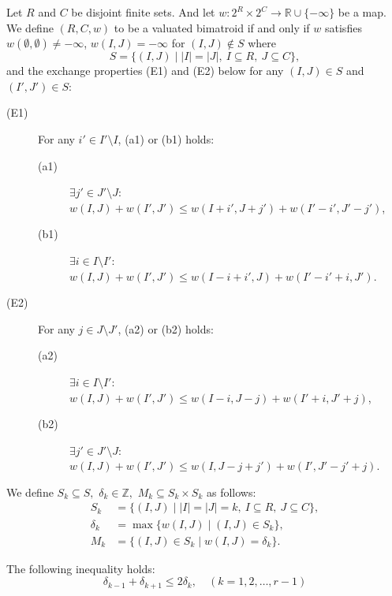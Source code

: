 \begin{definition}
Let $ R $ and $ C $ be disjoint finite sets. 
And let $ w : 2^R \times 2^C \to \mathbb{R} \cup \{ - \infty \} $ be a map. 
We define $ ( R, C, w ) $ to be a valuated bimatroid 
if and only if $ w $ satisfies $ w( \emptyset , \emptyset) \neq - \infty $, 
$ w (I,J) = - \infty $ for $( I,J) \notin S $ where
\[ S = \{ (I,J) \mid |I| = |J|, \  I \subseteq R , \ J \subseteq C \}, \]
and the exchange properties (E1) and (E2) below 
for any $ (I,J) \in S $ and $ ( I' ,J' ) \in S $:
\begin{description}
\item[(E1)] For any $ i' \in I' \setminus I$, (a1) or (b1) holds:
\begin{description}
\item[(a1)] $ \exists j' \in J' \setminus J :$ $ w(I,J) + w(I',J') \le w(I+ i', J+ j') + w ( I' - i' , J' - j') $,
\item[(b1)] $ \exists i \in I \setminus I' :$ $ w(I,J) + w(I',J') \le w(I - i + i', J) + w ( I' - i' + i , J' ) $.
\end{description} 
\item[(E2)] For any $ j \in J \setminus J' $, (a2) or (b2) holds:
\begin{description}
\item[(a2)] $ \exists i \in I \setminus I' :$ $ w(I,J) + w(I',J') \le w(I - i , J - j) + w ( I' + i , J' + j ) $,
\item[(b2)] $ \exists j' \in J' \setminus J :$ $ w(I,J) + w(I',J') \le w(I , J - j + j') + w ( I' , J' - j' + j) $.
\end{description} 
\end{description}
\end{definition}

We define 
$ S_k \subseteq S ,$ $ \delta_k \in \mathbb{Z}, $ $ M_k \subseteq S_k \times S_k $ 
as follows:
\begin{align*}
S_k &= \{ (I,J) \mid |I| = |J| = k, \ I \subseteq R , \ J \subseteq C \},\\
\delta_k &= \max \{ w (I,J) \mid (I,J) \in S_k \},\\
M_k &= \{ (I,J) \in S_k \mid w(I,J) = \delta_k \}.
\end{align*} 

\begin{proposition}
The following inequality holds:
\begin{equation}
\delta_{k-1} + \delta_{k+1} \le 2 \delta_k, \quad ( k = 1 ,2, \dots , r-1) \label{eqcon}
\end{equation}
\label{propc}
\end{proposition}

